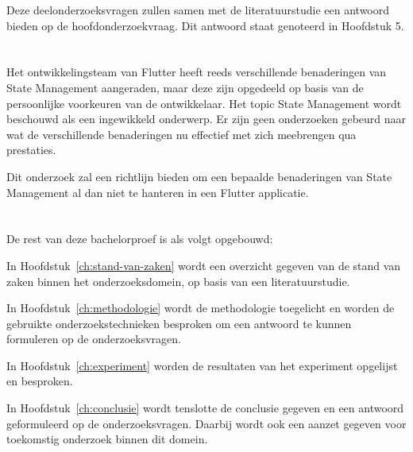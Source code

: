 Deze deelonderzoeksvragen zullen samen met de literatuurstudie een antwoord bieden op de hoofdonderzoekvraag. Dit antwoord staat genoteerd in Hoofdstuk 5.


\section{}
\label{sec:onderzoeksdoelstelling}

Het ontwikkelingsteam van Flutter heeft reeds verschillende benaderingen van State Management aangeraden, maar deze zijn opgedeeld op basis van de persoonlijke voorkeuren van de ontwikkelaar. Het topic State Management wordt beschouwd als een ingewikkeld onderwerp. Er zijn geen onderzoeken gebeurd naar wat de verschillende benaderingen nu effectief met zich meebrengen qua prestaties.

Dit onderzoek zal een richtlijn bieden om een bepaalde benaderingen van State Management al dan niet te hanteren in een Flutter applicatie. 

\section{}
\label{sec:opzet-bachelorproef}


De rest van deze bachelorproef is als volgt opgebouwd:

In Hoofdstuk~\ref{ch:stand-van-zaken} wordt een overzicht gegeven van de stand van zaken binnen het onderzoeksdomein, op basis van een literatuurstudie.

In Hoofdstuk~\ref{ch:methodologie} wordt de methodologie toegelicht en worden de gebruikte onderzoekstechnieken besproken om een antwoord te kunnen formuleren op de onderzoeksvragen.

In Hoofdstuk~\ref{ch:experiment} worden de resultaten van het experiment opgelijst en besproken.

In Hoofdstuk~\ref{ch:conclusie} wordt tenslotte de conclusie gegeven en een antwoord geformuleerd op de onderzoeksvragen. Daarbij wordt ook een aanzet gegeven voor toekomstig onderzoek binnen dit domein.

